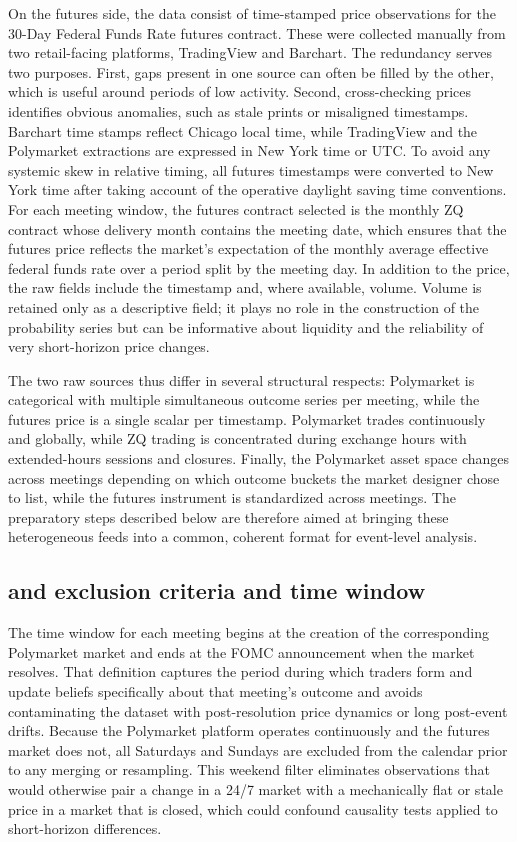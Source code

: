 On the futures side, the data consist of time-stamped price observations for the 30-Day Federal Funds Rate futures contract. These were collected manually from two retail-facing platforms, TradingView and Barchart. The redundancy serves two purposes. First, gaps present in one source can often be filled by the other, which is useful around periods of low activity. Second, cross-checking prices identifies obvious anomalies, such as stale prints or misaligned timestamps. Barchart time stamps reflect Chicago local time, while TradingView and the Polymarket extractions are expressed in New York time or UTC. To avoid any systemic skew in relative timing, all futures timestamps were converted to New York time after taking account of the operative daylight saving time conventions. For each meeting window, the futures contract selected is the monthly ZQ contract whose delivery month contains the meeting date, which ensures that the futures price reflects the market’s expectation of the monthly average effective federal funds rate over a period split by the meeting day. In addition to the price, the raw fields include the timestamp and, where available, volume. Volume is retained only as a descriptive field; it plays no role in the construction of the probability series but can be informative about liquidity and the reliability of very short-horizon price changes.

The two raw sources thus differ in several structural respects: Polymarket is categorical with multiple simultaneous outcome series per meeting, while the futures price is a single scalar per timestamp. Polymarket trades continuously and globally, while ZQ trading is concentrated during exchange hours with extended-hours sessions and closures. Finally, the Polymarket asset space changes across meetings depending on which outcome buckets the market designer chose to list, while the futures instrument is standardized across meetings. The preparatory steps described below are therefore aimed at bringing these heterogeneous feeds into a common, coherent format for event-level analysis.

\subsection{and exclusion criteria and time window}

The time window for each meeting begins at the creation of the corresponding Polymarket market and ends at the FOMC announcement when the market resolves. That definition captures the period during which traders form and update beliefs specifically about that meeting’s outcome and avoids contaminating the dataset with post-resolution price dynamics or long post-event drifts. Because the Polymarket platform operates continuously and the futures market does not, all Saturdays and Sundays are excluded from the calendar prior to any merging or resampling. This weekend filter eliminates observations that would otherwise pair a change in a 24/7 market with a mechanically flat or stale price in a market that is closed, which could confound causality tests applied to short-horizon differences.


